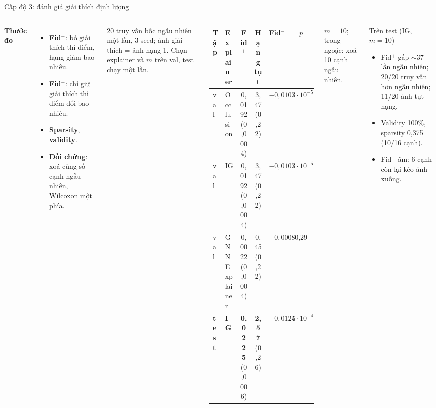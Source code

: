 \documentclass[10pt, aspectratio=169]{beamer}
\begin{document}
\begin{frame}{Cấp độ 3: đánh giá giải thích định lượng}
  \begin{columns}[T]
      \textbf{Thước đo}
      \begin{itemize}\small
        \item \textbf{Fid$^+$}: bỏ giải thích thì điểm, hạng giảm bao nhiêu.
        \item \textbf{Fid$^-$}: chỉ giữ giải thích thì điểm đổi bao nhiêu.
        \item \textbf{Sparsity}, \textbf{validity}.
        \item \textbf{Đối chứng}: xoá cùng số cạnh ngẫu nhiên, Wilcoxon một phía.
      \end{itemize}
      {\scriptsize 20 truy vấn bốc ngẫu nhiên một lần, 3 seed; ảnh giải thích = ảnh hạng 1. Chọn explainer và $m$ trên val, test chạy một lần.}
      \centering\scriptsize\setlength{\tabcolsep}{3pt}
      \begin{tabular}{l l c c c c}
        \toprule
        \textbf{Tập} & \textbf{Explainer} & \textbf{Fid$^+$} & \textbf{Hạng tụt} & \textbf{Fid$^-$} & $p$ \\
        \midrule
        val & Occlusion & 0,0192 (0,0004) & 3,47 (0,22) & $-0{,}0107$ & $3{\cdot}10^{-5}$ \\
        val & IG & 0,0192 (0,0004) & 3,47 (0,22) & $-0{,}0107$ & $3{\cdot}10^{-5}$ \\
        val & GNNExplainer & 0,0022 (0,0004) & 0,45 (0,22) & $-0{,}0008$ & 0,29 \\
        \textbf{test} & \textbf{IG} & \textbf{0,0225} (0,0006) & \textbf{2,57} (0,26) & $-0{,}0124$ & $5{\cdot}10^{-4}$ \\
        \bottomrule
      \end{tabular}
      \par{\tiny\color{xam} $m = 10$; trong ngoặc: xoá 10 cạnh ngẫu nhiên.}
      \begin{block}{Trên test (IG, $m=10$)}
        \begin{itemize}\small
          \item Fid$^+$ gấp $\sim$37 lần ngẫu nhiên; 20/20 truy vấn hơn ngẫu nhiên; 11/20 ảnh tụt hạng.
          \item Validity 100\%, sparsity 0,375 (10/16 cạnh).
          \item Fid$^-$ âm: 6 cạnh còn lại kéo ảnh xuống.
        \end{itemize}
      \end{block}
  \end{columns}
\end{frame}
\end{document}
